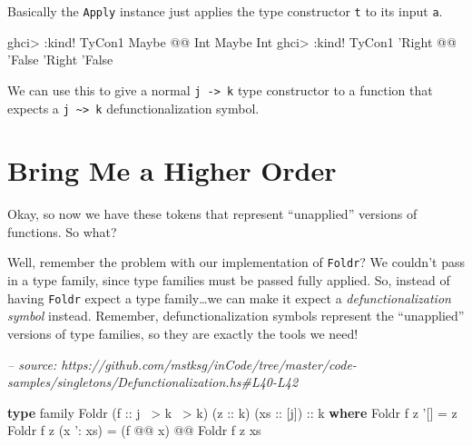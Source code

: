 \documentclass[]{article}
\newenvironment{Shaded}{}{}
\newcommand{\CommentTok}[1]{\textcolor[rgb]{0.38,0.63,0.69}{\textit{#1}}}
\newcommand{\DataTypeTok}[1]{\textcolor[rgb]{0.56,0.13,0.00}{#1}}
\newcommand{\FunctionTok}[1]{\textcolor[rgb]{0.02,0.16,0.49}{#1}}
\newcommand{\KeywordTok}[1]{\textcolor[rgb]{0.00,0.44,0.13}{\textbf{#1}}}
\newcommand{\NormalTok}[1]{#1}
\newcommand{\OtherTok}[1]{\textcolor[rgb]{0.00,0.44,0.13}{#1}}
\begin{document}
Basically the \texttt{Apply} instance just applies the type constructor
\texttt{t} to its input \texttt{a}.

\begin{Shaded}
\begin{Highlighting}[]
\NormalTok{ghci}\FunctionTok{>} \FunctionTok{:}\NormalTok{kind}\FunctionTok{!} \DataTypeTok{TyCon1} \DataTypeTok{Maybe} \FunctionTok{@@} \DataTypeTok{Int}
\DataTypeTok{Maybe} \DataTypeTok{Int}
\NormalTok{ghci}\FunctionTok{>} \FunctionTok{:}\NormalTok{kind}\FunctionTok{!} \DataTypeTok{TyCon1}\NormalTok{ '}\DataTypeTok{Right} \FunctionTok{@@}\NormalTok{ '}\DataTypeTok{False}
\NormalTok{'}\DataTypeTok{Right}\NormalTok{ '}\DataTypeTok{False}
\end{Highlighting}
\end{Shaded}

We can use this to give a normal \texttt{j\ -\textgreater{}\ k} type constructor
to a function that expects a \texttt{j\ \textasciitilde{}\textgreater{}\ k}
defunctionalization symbol.

\hypertarget{bring-me-a-higher-order}{%
\section{Bring Me a Higher Order}\label{bring-me-a-higher-order}}

Okay, so now we have these tokens that represent ``unapplied'' versions of
functions. So what?

Well, remember the problem with our implementation of \texttt{Foldr}? We
couldn't pass in a type family, since type families must be passed fully
applied. So, instead of having \texttt{Foldr} expect a type family\ldots{}we can
make it expect a \emph{defunctionalization symbol} instead. Remember,
defunctionalization symbols represent the ``unapplied'' versions of type
families, so they are exactly the tools we need!

\begin{Shaded}
\begin{Highlighting}[]
\CommentTok{-- source: https://github.com/mstksg/inCode/tree/master/code-samples/singletons/Defunctionalization.hs#L40-L42}

\KeywordTok{type}\NormalTok{ family }\DataTypeTok{Foldr}\NormalTok{ (}\OtherTok{f ::}\NormalTok{ j }\FunctionTok{~>}\NormalTok{ k }\FunctionTok{~>}\NormalTok{ k) (}\OtherTok{z ::}\NormalTok{ k) (}\OtherTok{xs ::}\NormalTok{ [j])}\OtherTok{ ::}\NormalTok{ k }\KeywordTok{where}
    \DataTypeTok{Foldr}\NormalTok{ f z '[]       }\FunctionTok{=}\NormalTok{ z}
    \DataTypeTok{Foldr}\NormalTok{ f z (x '}\FunctionTok{:}\NormalTok{ xs) }\FunctionTok{=}\NormalTok{ (f }\FunctionTok{@@}\NormalTok{ x) }\FunctionTok{@@} \DataTypeTok{Foldr}\NormalTok{ f z xs}
\end{Highlighting}
\end{Shaded}
\end{document}
